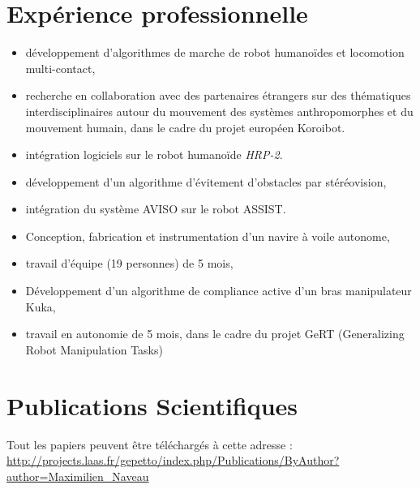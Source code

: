 \documentclass[11pt,a4paper]{moderncv}
\newcommand{\items}{\item \hspace{2mm}}
\begin{document}
\section{Exp\'erience professionnelle}
{
\begin{itemize}%
\items d\'eveloppement d'algorithmes de marche de robot humano\"ides et locomotion multi-contact,
\items recherche en collaboration avec des partenaires \'etrangers sur des th\'ematiques interdisciplinaires autour du mouvement des syst\`emes anthropomorphes et du mouvement humain, dans le cadre du projet europ\'een Koroibot.
\items int\'egration logiciels sur le robot humano\"ide \emph{HRP-2}.
\newline{}
\end{itemize}
}
%
%
{
\begin{itemize}%
\items d\'eveloppement d'un algorithme d'\'evitement d'obstacles par st\'er\'eovision,
\items int\'egration du syst\`eme AVISO sur le robot ASSIST.
\newline{}
\end{itemize}
}
%
%
{
\begin{itemize}%
\items Conception, fabrication et instrumentation d'un navire \`a voile autonome,
\items travail d'\'equipe (19 personnes) de 5 mois,
\newline{}
\end{itemize}
}
%
%
%
{
\begin{itemize}%
\items D\'eveloppement d'un algorithme de compliance active d'un bras manipulateur Kuka,
\items travail en autonomie de 5 mois, dans le cadre du projet GeRT (Generalizing Robot Manipulation Tasks)
\newline{}
\end{itemize}
}

\newpage


\section{Publications Scientifiques}

Tout les papiers peuvent \^etre t\'el\'echarg\'es \`a cette adresse :
\url{http://projects.laas.fr/gepetto/index.php/Publications/ByAuthor?author=Maximilien_Naveau}\\
\end{document}
